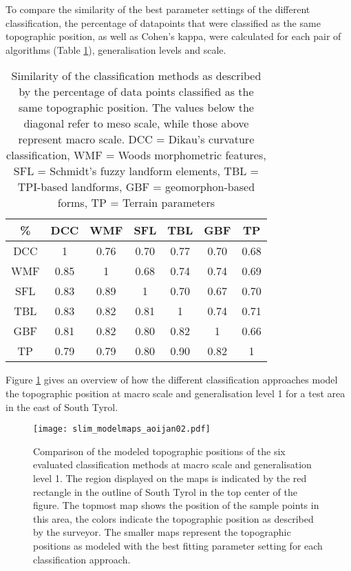\documentclass[preprint,12pt,authoryear]{elsarticle}
\begin{document}
To compare the similarity of the best parameter settings of the different classification, the percentage of datapoints that were classified as the same topographic position, as well as Cohen's kappa, were calculated for each pair of algorithms (Table \ref{table:similarity_matrix}), generalisation levels and scale. 
\begin{table}[ht]
\caption{Similarity of the classification methods as described by the percentage of data points classified as the same topographic position. The values below the diagonal refer to meso scale, while those above represent macro scale. DCC = Dikau's curvature classification, WMF = Woods morphometric features, SFL = Schmidt's fuzzy landform elements, TBL = TPI-based landforms, GBF = geomorphon-based forms, TP = Terrain parameters}
\centering
\begin{tabular}{ccccccc}
  \hline
\%  & DCC & WMF &SFL &TBL & GBF & TP \\ 
  \hline
DCC &1 & 0.76 & 0.70 & 0.77 & 0.70 & 0.68 \\ 
WMF &0.85  & 1 & 0.68 & 0.74 & 0.74 & 0.69 \\ 
SFL & 0.83 & 0.89 & 1 & 0.70 & 0.67 & 0.70 \\ 
TBL & 0.83 &0.82  &0.81  & 1 & 0.74 & 0.71 \\ 
GBF &0.81  &0.82  & 0.80  & 0.82 & 1 & 0.66 \\ 
TP &0.79  &0.79  &0.80  &0.90  &0.82  & 1 \\ 
   \hline
\end{tabular}
\label{table:similarity_matrix}
\end{table}
Figure \ref{fig:resultmaps} gives an overview of how the different classification approaches model the topographic position at macro scale and generalisation level 1 for a test area in the east of South Tyrol.
\begin{figure}
\texttt{[image: slim\_modelmaps\_aoijan02.pdf]}
\caption{Comparison of the modeled topographic positions of the six evaluated classification methods at macro scale and generalisation level 1. The region displayed on the maps is indicated by the red rectangle in the outline of South Tyrol in the top center of the figure. The topmost map shows the position of the sample points in this area, the colors indicate the topographic position as described by the surveyor. The smaller maps represent the topographic positions as modeled with the best fitting parameter setting for each classification approach.}
\label{fig:resultmaps}
\end{figure}
\end{document}
